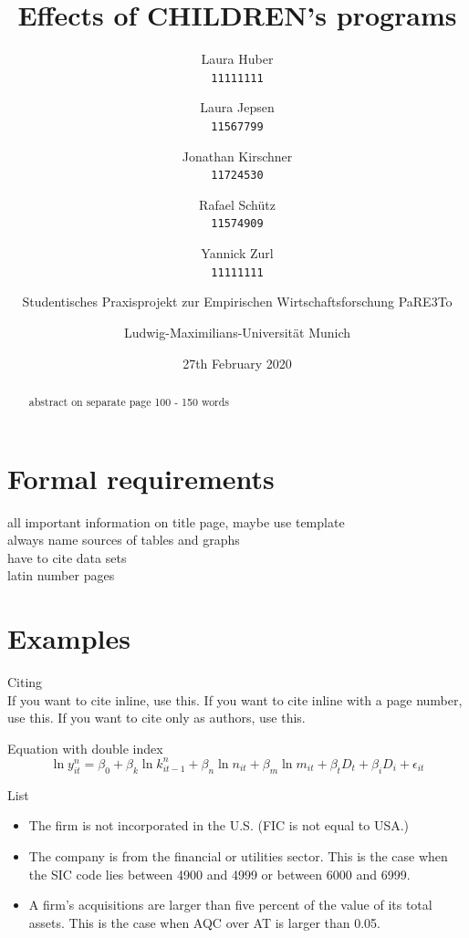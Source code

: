 \documentclass[12pt, a4paper, titlepage]{article}\usepackage[]{graphicx}\usepackage[]{color}
\title{Effects of CHILDREN's programs}
\author{
Laura Huber\\
\texttt{11111111}
\and
Laura Jepsen\\
\texttt{11567799}
\and
Jonathan Kirschner\\
\texttt{11724530}
\and
Rafael Schütz\\
\texttt{11574909} 
\and 
Yannick Zurl\\
\texttt{11111111}
\and
Studentisches Praxisprojekt zur Empirischen Wirtschaftsforschung PaRE3To\\
\and
Ludwig-Maximilians-Universität Munich
}
\date{27th February 2020}
\begin{document}
\maketitle

\tableofcontents
\listoftables

\listoffigures

\begin{abstract} 
abstract on separate page
100 - 150 words
\end{abstract}

\section{Formal requirements}
all important information on title page, maybe use template\\
always name sources of tables and graphs\\
have to cite data sets\\
latin number pages\\


\section{Examples}

Citing\\

If you want to cite \textcite{Millstein.2020} inline, use this.
If you want to cite \parencite[p.4]{Millenstein.2020} inline with a page number, use this.
If you want to cite \citeauthor{Millstein.2020} only as authors, use this.

Equation with double index\\

\begin{equation}
\label{ModelProdu}
\ln y_{it}^{n} = \beta_0 + \beta_k \ln k_{it-1}^{n} + \beta_n \ln n_{it} + \beta_m \ln m_{it} + \beta_t D_t + \beta_i D_i + \epsilon_{it}
\end{equation}

List\\

\begin{itemize}
  \item{The firm is not incorporated in the U.S. (FIC is not equal to USA.)}
  \item{The company is from the financial or utilities sector. This is the case when the SIC code lies between 4900 and 4999 or between 6000 and 6999.}
  \item{A firm's acquisitions are larger than five percent of the value of its total assets. This is the case when AQC over AT is larger than 0.05.} 
\end{itemize}
\end{document}
